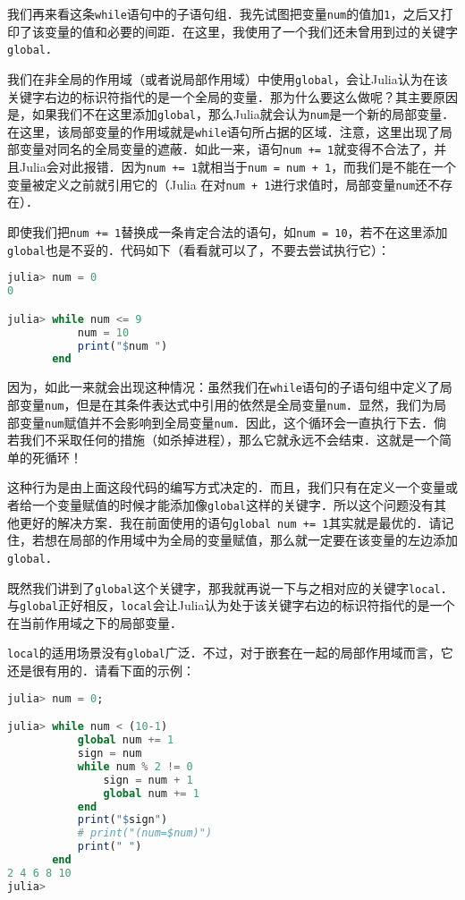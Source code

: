 我们再来看这条\verb|while|语句中的子语句组．我先试图把变量\verb|num|的值加\verb|1|，之后又打印了该变量的值和必要的间距．在这里，我使用了一个我们还未曾用到过的关键字\verb|global|．

我们在非全局的作用域（或者说局部作用域）中使用\verb|global|，会让Julia认为在该关键字右边的标识符指代的是一个全局的变量．那为什么要这么做呢？其主要原因是，如果我们不在这里添加\verb|global|，那么Julia就会认为\verb|num|是一个新的局部变量．在这里，该局部变量的作用域就是\verb|while|语句所占据的区域．注意，这里出现了局部变量对同名的全局变量的遮蔽．如此一来，语句\verb|num += 1|就变得不合法了，并且Julia会对此报错．因为\verb|num += 1|就相当于\verb|num = num + 1|，而我们是不能在一个变量被定义之前就引用它的（Julia 在对\verb|num + 1|进行求值时，局部变量\verb|num|还不存在）．

即使我们把\verb|num += 1|替换成一条肯定合法的语句，如\verb|num = 10|，若不在这里添加\verb|global|也是不妥的．代码如下（看看就可以了，不要去尝试执行它）：

\begin{lstlisting}[language=julia]
julia> num = 0
0

julia> while num <= 9 
           num = 10 
           print("$num ") 
       end
\end{lstlisting}

因为，如此一来就会出现这种情况：虽然我们在\verb|while|语句的子语句组中定义了局部变量\verb|num|，但是在其条件表达式中引用的依然是全局变量\verb|num|．显然，我们为局部变量\verb|num|赋值并不会影响到全局变量\verb|num|．因此，这个循环会一直执行下去．倘若我们不采取任何的措施（如杀掉进程），那么它就永远不会结束．这就是一个简单的死循环！

这种行为是由上面这段代码的编写方式决定的．而且，我们只有在定义一个变量或者给一个变量赋值的时候才能添加像\verb|global|这样的关键字．所以这个问题没有其他更好的解决方案．我在前面使用的语句\verb|global num += 1|其实就是最优的．请记住，若想在局部的作用域中为全局的变量赋值，那么就一定要在该变量的左边添加\verb|global|．

既然我们讲到了\verb|global|这个关键字，那我就再说一下与之相对应的关键字\verb|local|．与\verb|global|正好相反，\verb|local|会让Julia认为处于该关键字右边的标识符指代的是一个在当前作用域之下的局部变量．

\verb|local|的适用场景没有\verb|global|广泛．不过，对于嵌套在一起的局部作用域而言，它还是很有用的．请看下面的示例：

\begin{lstlisting}[language=julia]
julia> num = 0;

julia> while num < (10-1) 
           global num += 1
           sign = num
           while num % 2 != 0
               sign = num + 1
               global num += 1
           end
           print("$sign")
           # print("(num=$num)")
           print(" ")
       end
2 4 6 8 10 
julia> 
\end{lstlisting}

